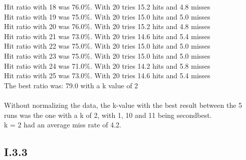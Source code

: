 \documentclass{article}
\begin{document}
Hit ratio with 18 was  76.0\%. With 20 tries 15.2 hits and 4.8 misses\\
Hit ratio with 19 was  75.0\%. With 20 tries 15.0 hits and 5.0 misses\\
Hit ratio with 20 was  76.0\%. With 20 tries 15.2 hits and 4.8 misses\\
Hit ratio with 21 was  73.0\%. With 20 tries 14.6 hits and 5.4 misses\\
Hit ratio with 22 was  75.0\%. With 20 tries 15.0 hits and 5.0 misses\\
Hit ratio with 23 was  75.0\%. With 20 tries 15.0 hits and 5.0 misses\\
Hit ratio with 24 was  71.0\%. With 20 tries 14.2 hits and 5.8 misses\\
Hit ratio with 25 was  73.0\%. With 20 tries 14.6 hits and 5.4 misses\\
The best ratio was: 79.0 with a k value of 2\\\\
Without normalizing the data, the k-value with the best result between the 5 runs was the one with a k of 2, with 1, 10 and 11 being secondbest.\\
k = 2 had an average miss rate of 4.2.

\subsection{I.3.3}
\end{document}
